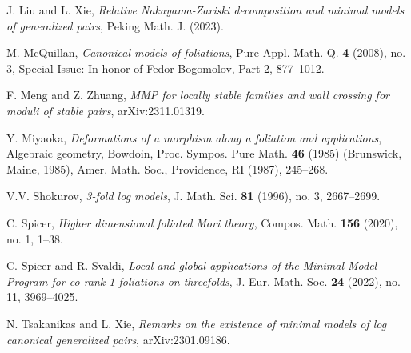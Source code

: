\documentclass[11pt]{amsart}
\numberwithin{equation}{section}
\theoremstyle{definition}
\theoremstyle{definition}
\theoremstyle{definition}
\begin{document}
\begin{thebibliography}{99}
 J. Liu and L. Xie, \textit{Relative Nakayama-Zariski decomposition and minimal models of generalized pairs}, Peking Math. J. (2023).


 M. McQuillan, \textit{Canonical models of foliations}, Pure Appl. Math. Q. \textbf{4} (2008), no. 3, Special Issue: In honor of Fedor Bogomolov, Part 2, 877--1012.

 F. Meng and Z. Zhuang, \textit{MMP for locally stable families and wall crossing for moduli of stable pairs}, arXiv:2311.01319.

 Y. Miyaoka, \textit{Deformations of a morphism along a foliation and applications}, Algebraic geometry, Bowdoin, Proc. Sympos. Pure Math. \textbf{46} (1985) (Brunswick, Maine, 1985), Amer. Math. Soc., Providence, RI (1987), 245--268.


 V.V. Shokurov, \textit{3-fold log models}, J. Math. Sci. \textbf{81} (1996), no. 3, 2667--2699.

 C. Spicer, \textit{Higher dimensional foliated Mori theory}, Compos. Math. \textbf{156} (2020), no. 1, 1--38.

 C. Spicer and R. Svaldi, \textit{Local and global applications of the Minimal Model Program for co-rank 1 foliations on threefolds}, J. Eur. Math. Soc. \textbf{24} (2022), no. 11, 3969--4025.

 N. Tsakanikas and L. Xie, \textit{Remarks on the existence of minimal models of log canonical generalized pairs}, arXiv:2301.09186.

\end{thebibliography}
\end{document}
